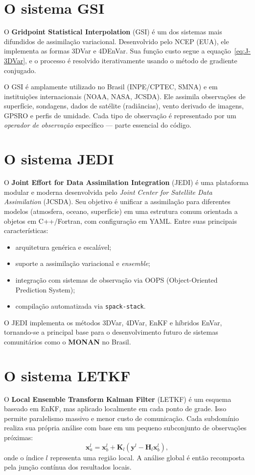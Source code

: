\section{O sistema GSI}
O \textbf{Gridpoint Statistical Interpolation} (GSI) é um dos sistemas mais difundidos de assimilação variacional.
Desenvolvido pelo NCEP (EUA), ele implementa as formas 3DVar e 4DEnVar.
Sua função custo segue a equação~\eqref{eq:J-3DVar}, e o processo é resolvido iterativamente usando o método de gradiente conjugado.

O GSI é amplamente utilizado no Brasil (INPE/CPTEC, SMNA) e em instituições internacionais (NOAA, NASA, JCSDA).
Ele assimila observações de superfície, sondagens, dados de satélite (radiâncias), vento derivado de imagens, GPSRO e perfis de umidade.
Cada tipo de observação é representado por um \emph{operador de observação} específico — parte essencial do código.

\section{O sistema JEDI}
O \textbf{Joint Effort for Data Assimilation Integration} (JEDI) é uma plataforma modular e moderna desenvolvida pelo \emph{Joint Center for Satellite Data Assimilation} (JCSDA).
Seu objetivo é unificar a assimilação para diferentes modelos (atmosfera, oceano, superfície) em uma estrutura comum orientada a objetos em C++/Fortran, com configuração em YAML.
Entre suas principais características:
\begin{itemize}
  \item arquitetura genérica e escalável;
  \item suporte a assimilação variacional e \emph{ensemble};
  \item integração com sistemas de observação via OOPS (Object-Oriented Prediction System);
  \item compilação automatizada via \texttt{spack-stack}.
\end{itemize}
O JEDI implementa os métodos 3DVar, 4DVar, EnKF e híbridos EnVar, tornando-se a principal base para o desenvolvimento futuro de sistemas comunitários como o \textbf{MONAN} no Brasil.

\section{O sistema LETKF}
O \textbf{Local Ensemble Transform Kalman Filter} (LETKF) é um esquema baseado em EnKF, mas aplicado localmente em cada ponto de grade.
Isso permite paralelismo massivo e menor custo de comunicação.
Cada subdomínio realiza sua própria análise com base em um pequeno subconjunto de observações próximas:
\[
\mathbf{x}_a^l = \mathbf{x}_b^l + \mathbf{K}_l (\mathbf{y}^l - \mathbf{H}_l \mathbf{x}_b^l),
\]
onde o índice $l$ representa uma região local.
A análise global é então recomposta pela junção contínua dos resultados locais.

